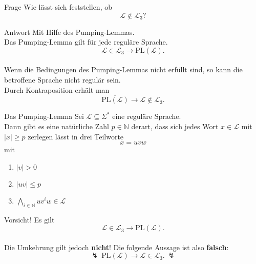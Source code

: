 \documentclass[]{beamer}
\begin{document}
\begin{frame}[squeeze]{}
  \begin{alertblock}{Frage}
    Wie lässt sich feststellen, ob
      \[\mathcal{L} \notin \mathcal{L}_3 \text{?}\]
  \end{alertblock}
  
  \pause
  
  \begin{exampleblock}{Antwort}
    Mit Hilfe des Pumping-Lemmas. \\
    \vspace*{0.5em}
    \pause
    Das Pumping-Lemma gilt für jede reguläre Sprache.
      \[\mathcal{L} \in \mathcal{L}_3 \to \mathrm{PL} \left( \mathcal{L} \right).\]\\
    \vspace*{0.5em}
    \pause
    Wenn die Bedingungen des Pumping-Lemmas nicht erfüllt sind, so kann die betroffene Sprache nicht regulär sein. \\
    \vspace*{0.5em}
    Durch Kontraposition erhält man
      \[\overline{\mathrm{PL}(\mathcal{L})} \to \mathcal{L} \notin \mathcal{L}_3.\]
  \end{exampleblock}
\end{frame}

\begin{frame}[squeeze]{}
  \begin{block}{Das Pumping-Lemma}
    Sei $\mathcal{L} \subseteq \Sigma^*$ eine reguläre Sprache. \\
    Dann gibt es eine natürliche Zahl $p \in \mathbb{N}$ derart, dass sich jedes Wort $x \in \mathcal{L}$ mit $|x| \geq p$ zerlegen lässt in drei Teilworte
    \vspace*{-0.5em}
      \[x = uvw\]
    \vspace*{-0.5em}
    mit
    \begin{enumerate}
      \item $|v| > 0$
      \item $|uv| \leq p$
      \item $\underset{i \in \mathbb{N}}{\bigwedge} uv^iw \in \mathcal{L}$
    \end{enumerate}
  \end{block}
  
  \vspace*{-0.5em}
  \pause
  
  \begin{alertblock}{Vorsicht!}
    Es gilt
    \vspace*{-0.5em}
    \[\mathcal{L} \in \mathcal{L}_3 \rightarrow \mathrm{PL} \left( \mathcal{L} \right).\]\\
    \vspace*{0.5em}
    Die Umkehrung gilt jedoch \textbf{nicht}! Die folgende Aussage ist also \textbf{falsch}:
    \vspace*{-0.5em}
    \[\lightning ~ \mathrm{PL} \left( \mathcal{L} \right) \rightarrow \mathcal{L} \in \mathcal{L}_3. ~ \lightning\]
  \end{alertblock}
\end{frame}
\end{document}
